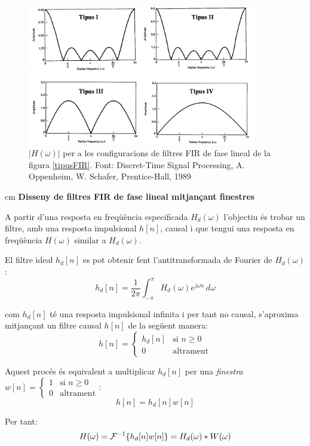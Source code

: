 \documentclass{article}
\begin{document}
\begin{figure}[htbp]
\begin{center}
\includegraphics[width=10cm]{tipusFIR_H.png}
\end{center}
\caption{$|H(\omega)|$ per a les configuracions de filtres FIR de fase lineal de la figura \ref{tipusFIR}.
Font: Discret-Time Signal
Processing, A. Oppenheim, W. Schafer, Prentice-Hall, 1989}
\label{tipusFIR_H}
\end{figure}



 cm
\noindent
\textbf{Disseny de filtres FIR de fase lineal mitjançant finestres}

A partir d'una resposta en freqüència especificada $H_d(\omega)$ l'objectiu és
trobar un filtre, amb una resposta impulsional $h[n]$, causal i que tengui 
una resposta en freqüència $H(\omega)$ similar a $H_d(\omega)$.

El filtre ideal $h_d[n]$ es pot obtenir fent l'antitransformada de Fourier de $H_d(\omega)$:
\[
h_d[n]=\frac{1}{2\pi} \int_{-\pi}^\pi H_d(\omega) e^{j\omega n} \, d\omega
\]

\noindent
com $h_d[n]$ té una resposta impulsional infinita i per tant no causal, s'aproxima mitjançant
un filtre causal $h[n]$ de la següent manera:
\[
h[n]=\begin{cases} h_d[n] & \text{si } n \geq 0 \\ 0 & \text{altrament} \end{cases}
\]

Aquest procés és equivalent a multiplicar $h_d[n]$ per una \textit{finestra} 
$w[n]=\begin{cases} 1 & \text{si } n \geq 0 \\ 0 & \text{altrament} \end{cases}$:
\[
h[n]=h_d[n] w[n]
\]

\noindent
Per tant:
\[
H(\omega)={\cal F}^{-1} \{ h_d[n] w[n] \} = H_d(\omega) * W(\omega) 
\]
\end{document}
